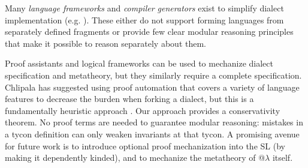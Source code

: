 \documentclass[10pt,preprint]{sigplanconf}
\begin{document}
Many \emph{language frameworks} and \emph{compiler generators} exist to simplify  dialect implementation (e.g. ). %
These either do not support forming languages from separately defined fragments or provide few clear modular reasoning principles that make it possible to reason separately about them. 

Proof assistants and logical frameworks can be used to mechanize dialect specification and metatheory, but they similarly require a complete specification. Chlipala has suggested using  proof automation that covers a variety of language features to decrease the burden when forking a  dialect, but this is a fundamentally heuristic approach \cite{Chlipala10}. Our approach provides a conservativity theorem. No proof terms are needed to guarantee modular reasoning:   mistakes in a tycon definition can only weaken invariants at that tycon. %
A promising avenue for future work is to introduce optional proof mechanization into the SL (by making it dependently kinded), and to mechanize the metatheory of @$\lambda$ itself.%
\end{document}

